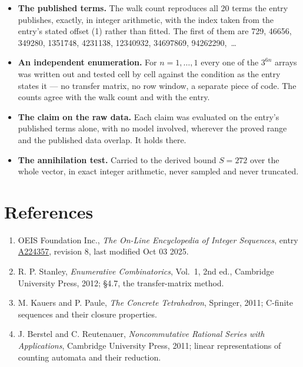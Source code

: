 \documentclass[11pt]{article}
\theoremstyle{definition}
\begin{document}
\begin{itemize}

\item {\bfseries The published terms.} The walk count reproduces all 20 terms the entry publishes, exactly, in integer arithmetic, with the index taken from the entry's stated offset (1) rather than fitted. The first of them are 729, 46656, 349280, 1351748, 4231138, 12340932, 34697869, 94262290,~\dots

\item {\bfseries An independent enumeration.} For $n = 1,\dots,1$ every one of the $3^{6n}$ arrays was written out and tested cell by cell against the condition as the entry states it --- no transfer matrix, no row window, a separate piece of code. The counts agree with the walk count and with the entry.

\item {\bfseries The claim on the raw data.} Each claim was evaluated on the entry's published terms alone, with no model involved, wherever the proved range and the published data overlap. It holds there.

\item {\bfseries The annihilation test.} Carried to the derived bound $S = 272$ over the whole vector, in exact integer arithmetic, never sampled and never truncated.

\end{itemize}

\section{References}

\begin{enumerate}

\item OEIS Foundation Inc., \emph{The On-Line Encyclopedia of Integer Sequences}, entry \href{https://oeis.org/A224357}{A224357}, revision 8, last modified Oct 03 2025.

\item R. P. Stanley, \emph{Enumerative Combinatorics}, Vol.~1, 2nd ed., Cambridge University Press, 2012; \S4.7, the transfer-matrix method.

\item M. Kauers and P. Paule, \emph{The Concrete Tetrahedron}, Springer, 2011; C-finite sequences and their closure properties.

\item J. Berstel and C. Reutenauer, \emph{Noncommutative Rational Series with Applications}, Cambridge University Press, 2011; linear representations of counting automata and their reduction.

\end{enumerate}
\end{document}
